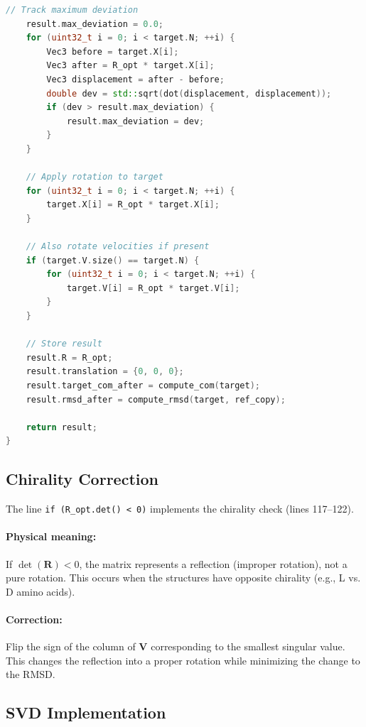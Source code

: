 \documentclass[11pt]{article}
\begin{document}
\begin{lstlisting}[language=C++]
    // Track maximum deviation
    result.max_deviation = 0.0;
    for (uint32_t i = 0; i < target.N; ++i) {
        Vec3 before = target.X[i];
        Vec3 after = R_opt * target.X[i];
        Vec3 displacement = after - before;
        double dev = std::sqrt(dot(displacement, displacement));
        if (dev > result.max_deviation) {
            result.max_deviation = dev;
        }
    }
    
    // Apply rotation to target
    for (uint32_t i = 0; i < target.N; ++i) {
        target.X[i] = R_opt * target.X[i];
    }
    
    // Also rotate velocities if present
    if (target.V.size() == target.N) {
        for (uint32_t i = 0; i < target.N; ++i) {
            target.V[i] = R_opt * target.V[i];
        }
    }
    
    // Store result
    result.R = R_opt;
    result.translation = {0, 0, 0};
    result.target_com_after = compute_com(target);
    result.rmsd_after = compute_rmsd(target, ref_copy);
    
    return result;
}
\end{lstlisting}

\subsection{Chirality Correction}

The line \texttt{if (R\_opt.det() < 0)} implements the chirality check (lines 117--122).

\paragraph{Physical meaning:} If $\det(\mathbf{R}) < 0$, the matrix represents a reflection (improper rotation), not a pure rotation. This occurs when the structures have opposite chirality (e.g., L vs. D amino acids).

\paragraph{Correction:} Flip the sign of the column of $\mathbf{V}$ corresponding to the smallest singular value. This changes the reflection into a proper rotation while minimizing the change to the RMSD.

\subsection{SVD Implementation}
\end{document}
